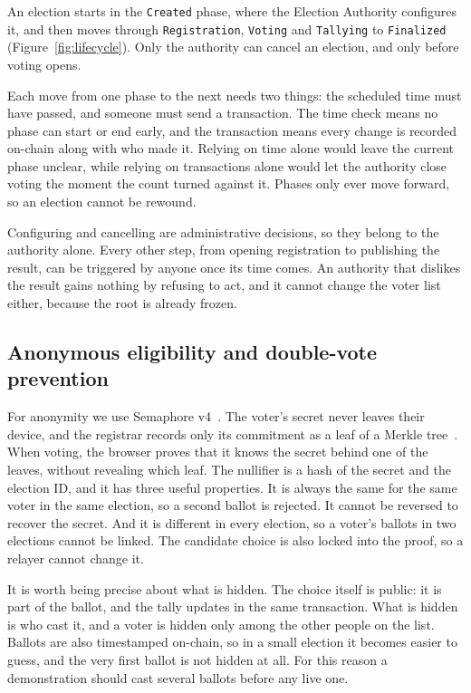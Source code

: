 An election starts in the \texttt{Created} phase, where the Election Authority
configures it, and then moves through \texttt{Registration}, \texttt{Voting}
and \texttt{Tallying} to \texttt{Finalized} (Figure~\ref{fig:lifecycle}). Only
the authority can cancel an election, and only before voting opens.

Each move from one phase to the next needs two things: the scheduled time must
have passed, and someone must send a transaction. The time check means no phase
can start or end early, and the transaction means every change is recorded
on-chain along with who made it. Relying on time alone would leave the current
phase unclear, while relying on transactions alone would let the authority
close voting the moment the count turned against it. Phases only ever move
forward, so an election cannot be rewound.

Configuring and cancelling are administrative decisions, so they belong to the
authority alone. Every other step, from opening registration to publishing the
result, can be triggered by anyone once its time comes. An authority that
dislikes the result gains nothing by refusing to act, and it cannot change the
voter list either, because the root is already frozen.

\subsection{Anonymous eligibility and double-vote prevention}

For anonymity we use Semaphore v4~\cite{semaphore}. The voter's secret never
leaves their device, and the registrar records only its commitment as a leaf
of a Merkle tree~\cite{merkle}. When voting, the browser proves that it knows
the secret behind one of the leaves, without revealing which leaf. The
nullifier is a hash of the secret and the election ID, and it has three useful
properties. It is always the same for the same voter in the same election, so a
second ballot is rejected. It cannot be reversed to recover the secret. And it
is different in every election, so a voter's ballots in two elections cannot
be linked. The candidate choice is also locked into the proof, so a relayer
cannot change it.

It is worth being precise about what is hidden. The choice itself is public: it
is part of the ballot, and the tally updates in the same transaction. What is
hidden is who cast it, and a voter is hidden only among the other people on the
list. Ballots are also timestamped on-chain, so in a small election it becomes
easier to guess, and the very first ballot is not hidden at all. For this
reason a demonstration should cast several ballots before any live one.

